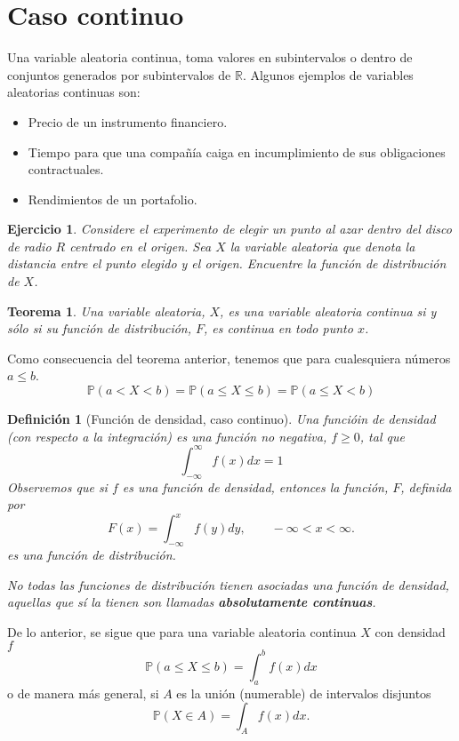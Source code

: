 \documentclass[11pt]{report}
\theoremstyle{break}
\newtheorem{definicion}{Definición}[chapter]
\newtheorem{teorema}{Teorema}[chapter]
\newtheorem{ejercicio}{Ejercicio}[chapter]
\theoremstyle{break}
\begin{document}
\section{Caso continuo}
\label{seccion:variables continuas}
Una variable aleatoria continua, toma valores en subintervalos o dentro de conjuntos generados por subintervalos de $\mathbb{R}$. Algunos ejemplos de variables aleatorias continuas son:
\begin{itemize}
\item Precio de un instrumento financiero.
\item Tiempo para que una compañía caiga en incumplimiento de sus obligaciones contractuales.
\item Rendimientos de un portafolio.
\end{itemize}

\begin{ejercicio}
Considere el experimento de elegir un punto al azar dentro del disco de radio $R$ centrado en el origen. Sea $X$ la variable aleatoria que denota la distancia entre el punto elegido y el origen. Encuentre la función de distribución de $X$.
\end{ejercicio}

\begin{teorema}
Una variable aleatoria, $X$, es una variable aleatoria continua si y sólo si su función de distribución, $F$, es continua en todo punto $x$.
\end{teorema}
Como consecuencia del teorema anterior, tenemos que para cualesquiera números $a \leq b$.
$$
\mathbb{P}(a < X < b) = \mathbb{P}(a \leq X \leq b) = \mathbb{P}(a \leq X < b)
$$

\begin{definicion}[Función de densidad, caso continuo]
\label{definicion:funcion de densidad caso continuo}
Una funcióin de densidad (con respecto a la integración) es una función no negativa, $f\geq 0$, tal que 
$$
\int_{-\infty}^{\infty} f(x)dx = 1
$$
Observemos que si $f$ es una función de densidad, entonces la función, $F$, definida por
$$
F(x) = \int_{- \infty}^{x} f(y)dy, \qquad -\infty < x < \infty.
$$
es una función de distribución.

No todas las funciones de distribución tienen asociadas una función de densidad, aquellas que sí la tienen son llamadas \textbf{absolutamente continuas}.
\end{definicion}

De lo anterior, se sigue que para una variable aleatoria continua $X$ con densidad $f$
$$
\mathbb{P}(a \leq X \leq b) = \int_{a}^{b}f(x)dx
$$
o de manera más general, si $A$ es la unión (numerable) de intervalos disjuntos
$$
\mathbb{P}(X \in A) = \int_{A}f(x)dx.
$$
\end{document}
